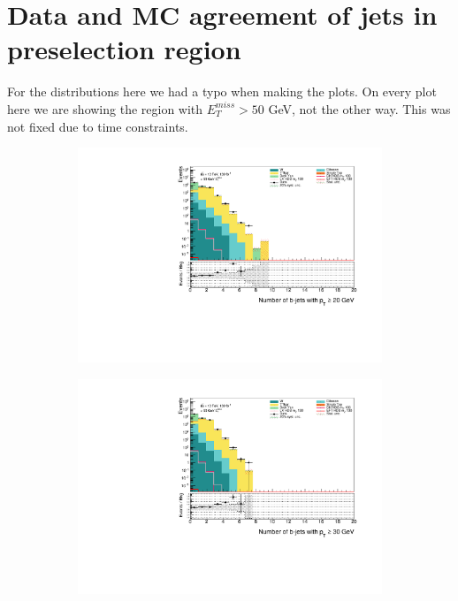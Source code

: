\documentclass[12pt, a4paper]{book}
\begin{document}
\chapter{Data and MC agreement of jets in preselection region}\label{appendix:JetSelection}
For the distributions here we had a typo when making the plots. On every plot here we are showing the region with $E_T^{miss}>50$ GeV, not the other way. This was not fixed due to time constraints. 
\graphicspath{{../../Plots/Data_Analysis/JetSelection/Control_region/}} 
\begin{figure}[!ht]
    \centering
    \begin{subfigure}[b]{0.49\textwidth}
        \centering
        \includegraphics[width=\textwidth]{bjetsPt20.pdf}
    \end{subfigure}
    \hfill\begin{subfigure}[b]{0.49\textwidth}
        \centering
        \includegraphics[width=\textwidth]{bjetsPt30.pdf}

\end{subfigure}
\end{figure}
\end{document}
